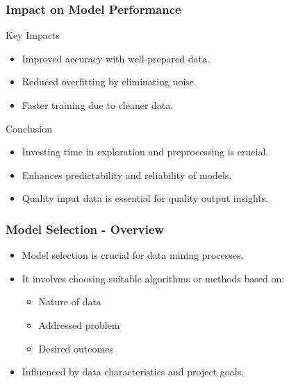 \documentclass[aspectratio=169]{beamer}
\begin{document}
\begin{frame}[fragile]
    \frametitle{Impact on Model Performance}
    \begin{block}{Key Impacts}
        \begin{itemize}
            \item Improved accuracy with well-prepared data.
            \item Reduced overfitting by eliminating noise.
            \item Faster training due to cleaner data.
        \end{itemize}
    \end{block}

    \begin{block}{Conclusion}
        \begin{itemize}
            \item Investing time in exploration and preprocessing is crucial.
            \item Enhances predictability and reliability of models.
            \item Quality input data is essential for quality output insights.
        \end{itemize}
    \end{block}
\end{frame}

\begin{frame}[fragile]
    \frametitle{Model Selection - Overview}
    \begin{itemize}
        \item Model selection is crucial for data mining processes.
        \item It involves choosing suitable algorithms or methods based on:
        \begin{itemize}
            \item Nature of data
            \item Addressed problem
            \item Desired outcomes
        \end{itemize}
        \item Influenced by data characteristics and project goals.
    \end{itemize}
\end{frame}
\end{document}
